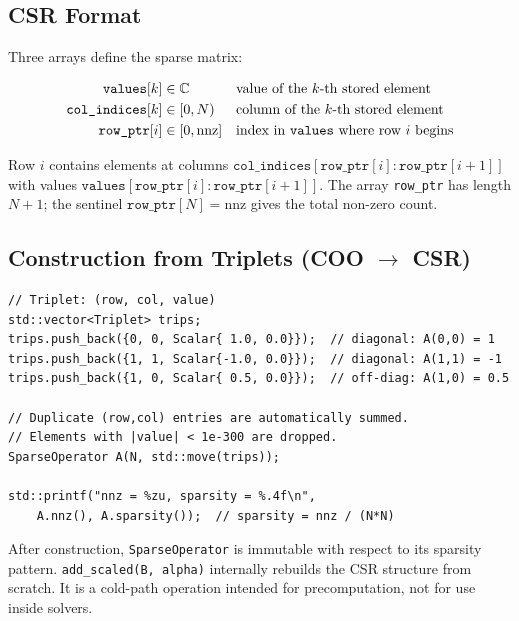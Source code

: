 \documentclass[11pt,a4paper,twoside]{book}
\newcommand{\complex}{\mathbb{C}}
\newcommand{\code}[1]{\texttt{\small#1}}
\theoremstyle{definition}
\theoremstyle{remark}
\begin{document}
\subsection{CSR Format}
\label{subsec:csr-format}

Three arrays define the sparse matrix:

\begin{align}
  \texttt{values}[k]       &\in \complex  &&\text{value of the $k$-th stored element} \\
  \texttt{col\_indices}[k] &\in [0, N)    &&\text{column of the $k$-th stored element} \\
  \texttt{row\_ptr}[i]     &\in [0, \mathrm{nnz}] &&\text{index in \texttt{values} where row $i$ begins}
\end{align}

Row $i$ contains elements at columns
$\texttt{col\_indices}[\texttt{row\_ptr}[i] : \texttt{row\_ptr}[i+1]]$
with values
$\texttt{values}[\texttt{row\_ptr}[i] : \texttt{row\_ptr}[i+1]]$.
The array \texttt{row\_ptr} has length $N+1$; the sentinel
$\texttt{row\_ptr}[N] = \mathrm{nnz}$ gives the total non-zero count.

\subsection{Construction from Triplets (COO $\to$ CSR)}
\label{subsec:triplet-construction}

\begin{verbatim}
// Triplet: (row, col, value)
std::vector<Triplet> trips;
trips.push_back({0, 0, Scalar{ 1.0, 0.0}});  // diagonal: A(0,0) = 1
trips.push_back({1, 1, Scalar{-1.0, 0.0}});  // diagonal: A(1,1) = -1
trips.push_back({1, 0, Scalar{ 0.5, 0.0}});  // off-diag: A(1,0) = 0.5

// Duplicate (row,col) entries are automatically summed.
// Elements with |value| < 1e-300 are dropped.
SparseOperator A(N, std::move(trips));

std::printf("nnz = %zu, sparsity = %.4f\n",
    A.nnz(), A.sparsity());  // sparsity = nnz / (N*N)
\end{verbatim}

\begin{notebox}
  After construction, \code{SparseOperator} is immutable with respect
  to its sparsity pattern. \code{add\_scaled(B, alpha)} internally
  rebuilds the CSR structure from scratch. It is a cold-path operation
  intended for precomputation, not for use inside solvers.
\end{notebox}
\end{document}
